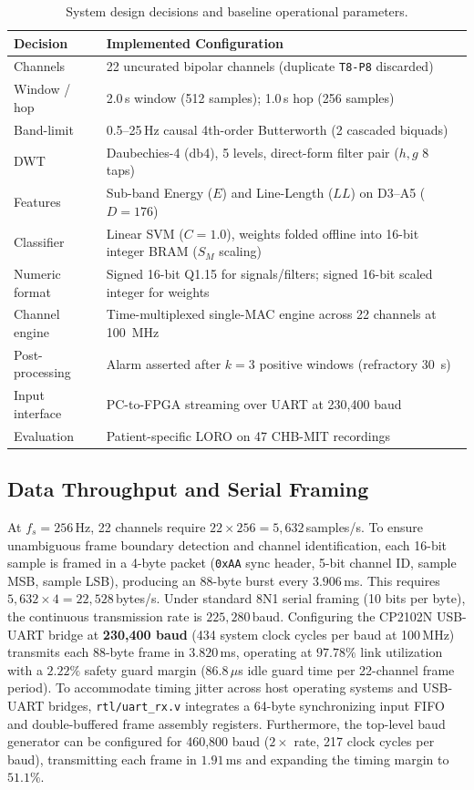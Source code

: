 \documentclass[10pt,twocolumn,letterpaper]{article}
\begin{document}
\begin{table}[t]
\centering
\caption{System design decisions and baseline operational parameters.}
\label{tab:decisions}
\footnotesize
\begin{tabularx}{\columnwidth}{@{}p{2.2cm}X@{}}
\toprule
Decision & Implemented Configuration \\
\midrule
Channels & 22 uncurated bipolar channels (duplicate \texttt{T8-P8} discarded) \\
Window / hop & 2.0\,s window (512 samples); 1.0\,s hop (256 samples) \\
Band-limit & 0.5--25\,Hz causal 4th-order Butterworth (2 cascaded biquads) \\
DWT & Daubechies-4 (db4), 5 levels, direct-form filter pair ($h, g$ 8 taps) \\
Features & Sub-band Energy ($E$) and Line-Length ($LL$) on D3--A5 ($D=176$) \\
Classifier & Linear SVM ($C=1.0$), weights folded offline into 16-bit integer BRAM ($S_M$ scaling) \\
Numeric format & Signed 16-bit Q1.15 for signals/filters; signed 16-bit scaled integer for weights \\
Channel engine & Time-multiplexed single-MAC engine across 22 channels at 100~MHz \\
Post-processing & Alarm asserted after $k=3$ positive windows (refractory 30~s) \\
Input interface & PC-to-FPGA streaming over UART at 230,400 baud \\
Evaluation & Patient-specific LORO on 47 CHB-MIT recordings \\
\bottomrule
\end{tabularx}
\end{table}

\subsection{Data Throughput and Serial Framing}

At $f_s = 256$\,Hz, 22 channels require $22 \times 256 = 5{,}632$\,samples/s. To ensure unambiguous frame boundary detection and channel identification, each 16-bit sample is framed in a 4-byte packet (\texttt{0xAA} sync header, 5-bit channel ID, sample MSB, sample LSB), producing an 88-byte burst every $3.906$\,ms. This requires $5{,}632 \times 4 = 22{,}528$\,bytes/s. Under standard 8N1 serial framing (10 bits per byte), the continuous transmission rate is $225{,}280$\,baud. Configuring the CP2102N USB-UART bridge at \textbf{230,400 baud} (434 system clock cycles per baud at 100\,MHz) transmits each 88-byte frame in $3.820$\,ms, operating at $97.78\%$ link utilization with a $2.22\%$ safety guard margin ($86.8\,\mu$s idle guard time per 22-channel frame period). To accommodate timing jitter across host operating systems and USB-UART bridges, \texttt{rtl/uart\_rx.v} integrates a 64-byte synchronizing input FIFO and double-buffered frame assembly registers. Furthermore, the top-level baud generator can be configured for 460,800 baud ($2\times$ rate, 217 clock cycles per baud), transmitting each frame in $1.91$\,ms and expanding the timing margin to $51.1\%$.
\end{document}
